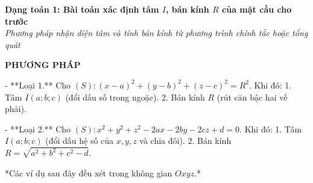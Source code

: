\documentclass[12pt,a4paper]{article}
\newenvironment{lesson}[2]{
	\noindent\textbf{\Large #1}\\
	\textit{#2}
}{}
\begin{document}
\begin{lesson}{Dạng toán 1: Bài toán xác định tâm $I$, bán kính $R$ của mặt cầu cho trước}{Phương pháp nhận diện tâm và tính bán kính từ phương trình chính tắc hoặc tổng quát}

\textbf{PHƯƠNG PHÁP}

- **Loại 1.** Cho $(S): (x-a)^2 + (y-b)^2 + (z-c)^2 = R^2$. Khi đó:
  1. Tâm $I(a;b;c)$ (đổi dấu số trong ngoặc).
  2. Bán kính $R$ (rút căn bậc hai vế phải).

- **Loại 2.** Cho $(S): x^2 + y^2 + z^2 - 2ax - 2by - 2cz + d = 0$. Khi đó:
  1. Tâm $I(a;b;c)$ (đổi dấu hệ số của $x, y, z$ và chia đôi).
  2. Bán kính $R = \sqrt{a^2 + b^2 + c^2 - d}$.

*Các ví dụ sau đây đều xét trong không gian $Oxyz$.*

\end{lesson}
\end{document}
